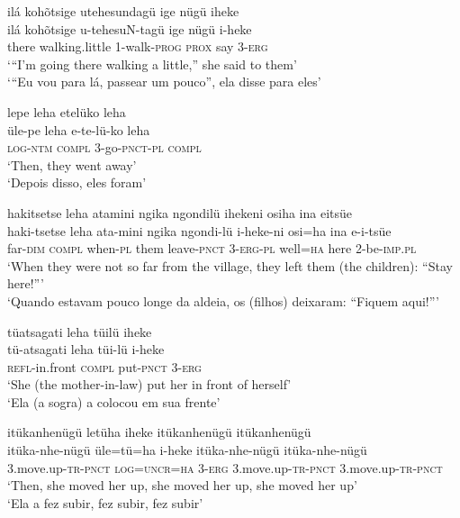 \documentclass[output=paper,
modfonts,nonflat
]{langsci/langscibook}
\begin{document}
\ea ilá kohõtsige utehesundagü ige nügü iheke \\[.3em]
\gll ilá	kohõtsige	u-tehesuN-tagü	ige	nügü	i-heke \\
there  	walking.little 	1-walk-\textsc{prog} 		\textsc{prox}	say	3-\textsc{erg} \\
\glt ‘“I’m going there walking a little,” she said to them’ \\
‘“Eu vou para lá, passear um pouco”, ela disse para eles’ \\
\z

\ea lepe leha etelüko leha \\[.3em]
\gll üle-pe		leha	e-te-lü-ko	leha \\
\textsc{log-ntm}	\textsc{compl} 3-go-\textsc{pnct-pl}	\textsc{compl} \\
\glt ‘Then, they went away’ \\
‘Depois disso, eles foram’ \\
\z

\ea hakitsetse leha atamini ngika ngondilü ihekeni osiha ina eitsüe \\[.3em]
\gll haki-tsetse	leha	ata-mini	ngika		ngondi-lü	i-heke-ni osi=ha	ina e-i-tsüe \\
far-\textsc{dim}		\textsc{compl}	when-\textsc{pl} 	them	leave-\textsc{pnct} 	3-\textsc{erg-pl} well=\textsc{ha} 	here 2-be-\textsc{imp.pl} \\
\glt ‘When they were not so far from the village, they left them (the children): “Stay here!”’ \\
‘Quando estavam pouco longe da aldeia, os (filhos) deixaram: “Fiquem aqui!”’
\z



\ea tüatsagati leha tüilü iheke \\[.3em]
\gll tü-atsagati	leha	tüi-lü		i-heke \\
\textsc{refl}-in.front	\textsc{compl}	put-\textsc{pnct} 	3-\textsc{erg} \\
\glt ‘She (the mother-in-law) put her in front of herself’ \\
‘Ela (a sogra) a colocou em sua frente’ \\
\z

 
\ea itükanhenügü letüha iheke itükanhenügü itükanhenügü \\[.3em]
\gll itüka-nhe-nügü	üle=tü=ha	i-heke itüka-nhe-nügü itüka-nhe-nügü \\
3.move.up-\textsc{tr-pnct} 	\textsc{log=uncr}=\textsc{ha}	3-\textsc{erg} 3.move.up-\textsc{tr-pnct} 3.move.up\textsc{-tr-pnct} \\
\glt ‘Then, she moved her up, she moved her up, she moved her up’ \\
‘Ela a fez subir, fez subir, fez subir’{\footnotemark} \\
\z
\end{document}
